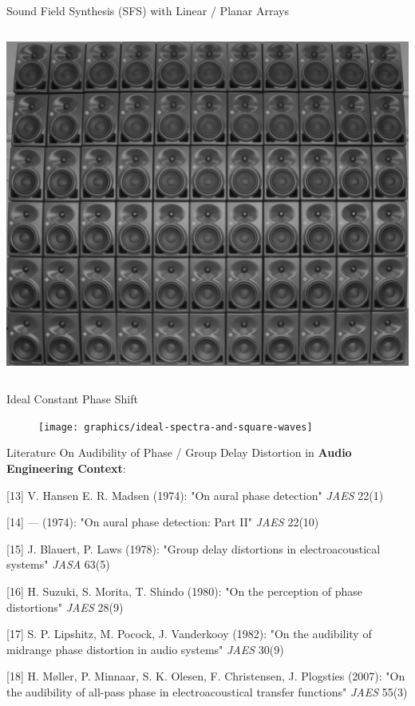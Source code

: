 \documentclass[mathserif]{intbeamer}
\begin{document}
\begin{frame}{Sound Field Synthesis (SFS) with Linear / Planar Arrays}
\begin{columns}[T]
{\includegraphics[width=1\textwidth]{graphics/planararray}
}
\end{columns}
\end{frame}
%
%
%
\begin{frame}{Ideal Constant Phase Shift}
\begin{figure}
\texttt{[image: graphics/ideal-spectra-and-square-waves]}
\end{figure}
\end{frame}
%
%
%
\begin{frame}{Literature On Audibility of Phase / Group Delay Distortion}
in \textbf{Audio Engineering Context}:
\small

[13] V. Hansen E. R. Madsen (1974): "On aural phase detection" \textit{JAES}
22(1)%

[14] --- (1974): "On aural phase detection: Part II" \textit{JAES}
22(10)%

[15] J. Blauert, P. Laws (1978): "Group delay distortions in electroacoustical
systems" \textit{JASA} 63(5)%

[16] H. Suzuki, S. Morita, T. Shindo (1980): "On the perception of phase
distortions" \textit{JAES} 28(9)%

[17] S. P. Lipshitz, M. Pocock, J. Vanderkooy (1982): "On the audibility of
midrange phase distortion in audio systems" \textit{JAES} 30(9)

[18] H. Møller, P. Minnaar, S. K. Olesen, F. Christensen, J. Plogsties (2007): "On
the audibility of all-pass phase in electroacoustical transfer functions"
\textit{JAES} 55(3)%
\end{frame}
\end{document}
